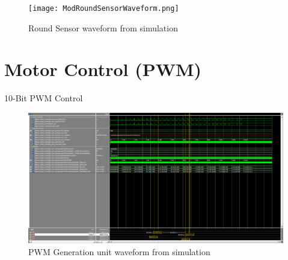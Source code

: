 \documentclass {scrartcl}
\begin{document}
\begin{figure}[h]
	\centering
		\texttt{[image: ModRoundSensorWaveform.png]}
		\caption{Round Sensor waveform from simulation}
	\label{fig:ModRoundSensorWaveform}
\end{figure}


\section{Motor Control (PWM)}
10-Bit PWM Control

\begin{figure}[h]
	\centering
		\includegraphics[angle = 90, height=1.00\textheight]{MotorControlWaveform.png}
	\caption{PWM Generation unit waveform from simulation}
	\label{fig:MotorControlWaveform}
\end{figure}


\end{document}
